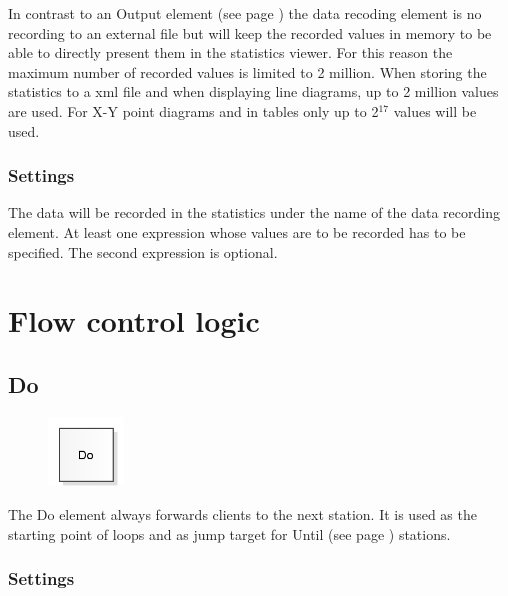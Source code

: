 In contrast to an Output element (see page \pageref{ref:ModelElementOutput}) the data recoding element
is no recording to an external file but will keep the recorded values in memory to be able to
directly present them in the statistics viewer. For this reason the maximum number of recorded
values is limited to 2 million. When storing the statistics to a xml file and when displaying
line diagrams, up to 2 million values are used. For X-Y point diagrams and in tables only up to
2$^{17}$ values will be used.

\subsection*{Settings}

The data will be recorded in the statistics under the name of the data recording element. 
At least one expression whose values are to be recorded has to be specified.
The second expression is optional.





\chapter{Flow control logic}

\section{Do}
\label{ref:ModelElementLogicDo}

\begin{figure}
\vspace{-22pt}
\includegraphics[width=2cm]{imageModelElementLogicDo.png}
\vspace{-22pt}
\end{figure}

The Do element always forwards clients to the next station.
It is used as the starting point of loops and as jump target
for Until (see page \pageref{ref:ModelElementLogicUntil}) stations.

\subsection*{Settings}

